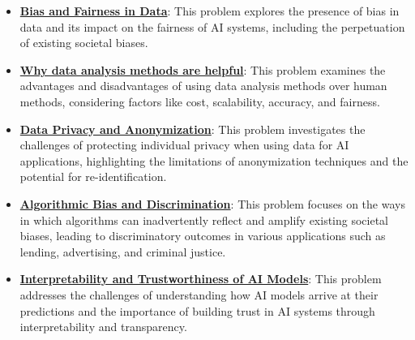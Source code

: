 \documentclass{article}%
\begin{document}
\begin{itemize}[leftmargin=*]%
\item \href{https://purdue.brightspace.com/d2l/common/assets/pdfjs-d2l-dist/1.0.14-legacy/web/viewer.html?file=%2Fcontent%2Fenforced%2F1095467-wl.202510.CS.24300.001%2F16L2-ethics.pdf%3Fou%3D1095467&lang=en-us&container=d2l-fileviewer-rendered-pdf&fullscreen=d2l-fileviewer-rendered-pdf-dialog&height=667#page=2}{\textbf{Bias and Fairness in Data}}: This problem explores the presence of bias in data and its impact on the fairness of AI systems, including the perpetuation of existing societal biases.%
\item \href{https://purdue.brightspace.com/d2l/common/assets/pdfjs-d2l-dist/1.0.14-legacy/web/viewer.html?file=%2Fcontent%2Fenforced%2F1095467-wl.202510.CS.24300.001%2F16L2-ethics.pdf%3Fou%3D1095467&lang=en-us&container=d2l-fileviewer-rendered-pdf&fullscreen=d2l-fileviewer-rendered-pdf-dialog&height=667#page=3}{\textbf{Why data analysis methods are helpful}}: This problem examines the advantages and disadvantages of using data analysis methods over human methods, considering factors like cost, scalability, accuracy, and fairness.%
\item \href{https://purdue.brightspace.com/d2l/common/assets/pdfjs-d2l-dist/1.0.14-legacy/web/viewer.html?file=%2Fcontent%2Fenforced%2F1095467-wl.202510.CS.24300.001%2F16L2-ethics.pdf%3Fou%3D1095467&lang=en-us&container=d2l-fileviewer-rendered-pdf&fullscreen=d2l-fileviewer-rendered-pdf-dialog&height=667#page=10}{\textbf{Data Privacy and Anonymization}}: This problem investigates the challenges of protecting individual privacy when using data for AI applications, highlighting the limitations of anonymization techniques and the potential for re-identification.%
\item \href{https://purdue.brightspace.com/d2l/common/assets/pdfjs-d2l-dist/1.0.14-legacy/web/viewer.html?file=%2Fcontent%2Fenforced%2F1095467-wl.202510.CS.24300.001%2F16L2-ethics.pdf%3Fou%3D1095467&lang=en-us&container=d2l-fileviewer-rendered-pdf&fullscreen=d2l-fileviewer-rendered-pdf-dialog&height=667#page=12}{\textbf{Algorithmic Bias and Discrimination}}: This problem focuses on the ways in which algorithms can inadvertently reflect and amplify existing societal biases, leading to discriminatory outcomes in various applications such as lending, advertising, and criminal justice.%
\item \href{https://purdue.brightspace.com/d2l/common/assets/pdfjs-d2l-dist/1.0.14-legacy/web/viewer.html?file=%2Fcontent%2Fenforced%2F1095467-wl.202510.CS.24300.001%2F16L2-ethics.pdf%3Fou%3D1095467&lang=en-us&container=d2l-fileviewer-rendered-pdf&fullscreen=d2l-fileviewer-rendered-pdf-dialog&height=667#page=29}{\textbf{Interpretability and Trustworthiness of AI Models}}: This problem addresses the challenges of understanding how AI models arrive at their predictions and the importance of building trust in AI systems through interpretability and transparency.%

\end{itemize}
\end{document}
